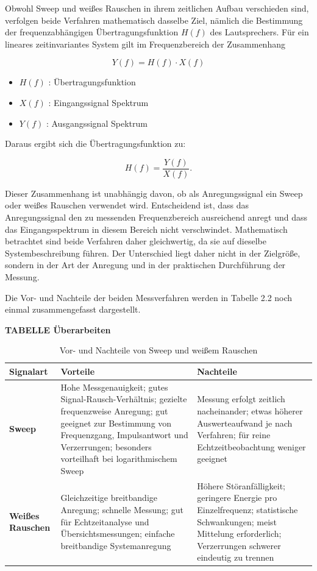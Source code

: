 Obwohl Sweep und weißes Rauschen in ihrem zeitlichen Aufbau verschieden sind, verfolgen beide Verfahren mathematisch dasselbe Ziel, nämlich die Bestimmung der frequenzabhängigen Übertragungsfunktion \(H(f)\) des Lautsprechers. Für ein lineares zeitinvariantes System gilt im Frequenzbereich der Zusammenhang

\begin{equation}
Y(f) = H(f) \cdot X(f)
\end{equation}

\begin{itemize}
    \item $H(f)$ : Übertragungsfunktion
    \item $X(f)$ : Eingangssignal Spektrum
    \item $Y(f)$ : Ausgangssignal Spektrum
\end{itemize}

Daraus ergibt sich die Übertragungsfunktion zu:

\begin{equation}
H(f) = \frac{Y(f)}{X(f)}.
\end{equation}

Dieser Zusammenhang ist unabhängig davon, ob als Anregungssignal ein Sweep oder weißes Rauschen verwendet wird. Entscheidend ist, dass das Anregungssignal den zu messenden Frequenzbereich ausreichend anregt und dass das Eingangsspektrum in diesem Bereich nicht verschwindet. Mathematisch betrachtet sind beide Verfahren daher gleichwertig, da sie auf dieselbe Systembeschreibung führen. Der Unterschied liegt daher nicht in der Zielgröße, sondern in der Art der Anregung und in der praktischen Durchführung der Messung.

Die Vor- und Nachteile der beiden Messverfahren werden in Tabelle 2.2 noch einmal zusammengefasst dargestellt.

\textbf{TABELLE Überarbeiten}
 
\begin{table}[h]
\centering
\caption{Vor- und Nachteile von Sweep und weißem Rauschen}
\begin{tabular}{|p{1cm}|p{5cm}|p{5cm}|}
\hline
\textbf{Signalart} & \textbf{Vorteile} & \textbf{Nachteile} \\
\hline
\textbf{Sweep} & Hohe Messgenauigkeit; gutes Signal-Rausch-Verhältnis; gezielte frequenzweise Anregung; gut geeignet zur Bestimmung von Frequenzgang, Impulsantwort und Verzerrungen; besonders vorteilhaft bei logarithmischem Sweep & Messung erfolgt zeitlich nacheinander; etwas höherer Auswerteaufwand je nach Verfahren; für reine Echtzeitbeobachtung weniger geeignet \\
\hline
\textbf{Weißes Rauschen} & Gleichzeitige breitbandige Anregung; schnelle Messung; gut für Echtzeitanalyse und Übersichtsmessungen; einfache breitbandige Systemanregung & Höhere Störanfälligkeit; geringere Energie pro Einzelfrequenz; statistische Schwankungen; meist Mittelung erforderlich; Verzerrungen schwerer eindeutig zu trennen \\
\hline
\end{tabular}
\label{tab:sweep_weissrauschen}
\end{table}

